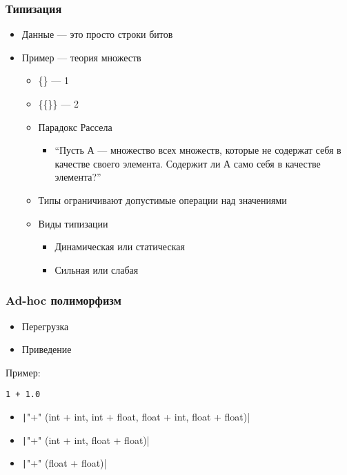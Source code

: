 \documentclass[xetex,mathserif,serif]{beamer}
\begin{document}
	\begin{frame}
		\frametitle{Типизация}
		\begin{itemize}
			\item Данные --- это просто строки битов
			\item Пример --- теория множеств
			\begin{itemize}
				\item \{\} --- 1
				\item \{\{\}\} --- 2
				\item Парадокс Рассела
				\begin{itemize}
					\item ``Пусть А --- множество всех множеств, которые не содержат себя в качестве своего элемента. Содержит ли А само себя в качестве элемента?''
				\end{itemize}
				\item Типы ограничивают допустимые операции над значениями
				\item Виды типизации
				\begin{itemize}
					\item Динамическая или статическая
					\item Сильная или слабая
				\end{itemize}
			\end{itemize}
		\end{itemize}
	\end{frame}

	\begin{frame}[fragile]
		\frametitle{Ad-hoc полиморфизм}
		\begin{itemize}
			\item Перегрузка
			\item Приведение
		\end{itemize}
		Пример:
		\begin{verbatim}
1 + 1.0
		\end{verbatim}

		\begin{itemize}
			\item \texttt|"+" (int + int, int + float, float + int, float + float)|
			\item \texttt|"+" (int + int, float + float)|
			\item \texttt|"+" (float + float)|
		\end{itemize}
	\end{frame}
\end{document}
